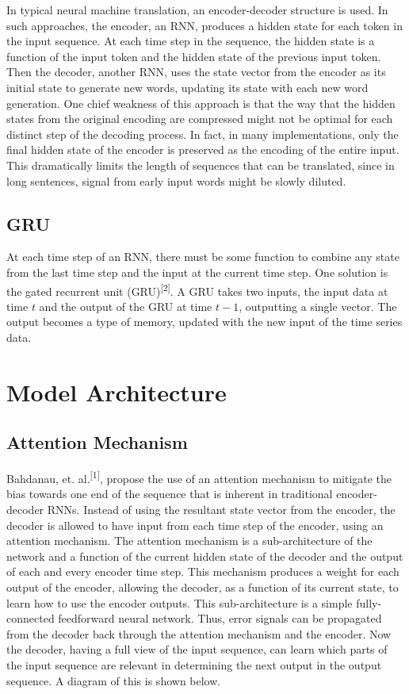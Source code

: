 \documentclass[letterpaper, 10pt]{article}
\begin{document}
\begin{multicols}{2}
In typical neural machine translation, an encoder-decoder structure is used.
In such approaches, the encoder, an RNN, produces a hidden state for each token in the input
sequence.
At each time step in the sequence, the hidden state is a function of the input token and the hidden
state of the previous input token.
Then the decoder, another RNN, uses the state vector from the encoder as its initial state to
generate new words, updating its state with each new word generation.
One chief weakness of this approach is that the way that the hidden states from the original
encoding are compressed might not be optimal for each distinct step of the decoding process.
In fact, in many implementations, only the final hidden state of the encoder is preserved as the
encoding of the entire input.
This dramatically limits the length of sequences that can be translated, since in long sentences,
signal from early input words might be slowly diluted.

\subsection{GRU}

At each time step of an RNN, there must be some function to combine any state from the last time
step and the input at the current time step.
One solution is the gated recurrent unit (GRU)\textsuperscript{[2]}.
A GRU takes two inputs, the input data at time $t$ and the output of the GRU at time $t-1$, outputting
a single vector.
The output becomes a type of memory, updated with the new input of the time series data.

\section{Model Architecture}

\subsection{Attention Mechanism}
Bahdanau, et. al.\textsuperscript{[1]}, propose the use of an attention mechanism to mitigate the bias
towards one end of the sequence that is inherent in traditional encoder-decoder RNNs.
Instead of using the resultant state vector from the encoder, the decoder is allowed to have input
from each time step of the encoder, using an attention mechanism.
The attention mechanism is a sub-architecture of the network and a function of the current hidden
state of the decoder and the output of each and every encoder time step.
This mechanism produces a weight for each output of the encoder, allowing the decoder, as a function
of its current state, to learn how to use the encoder outputs.
This sub-architecture is a simple fully-connected feedforward neural network.
Thus, error signals can be propagated from the decoder back through the attention mechanism and
the encoder.
Now the decoder, having a full view of the input sequence, can learn which parts of the input
sequence are relevant in determining the next output in the output sequence.
A diagram of this is shown below.


\end{multicols}
\end{document}
